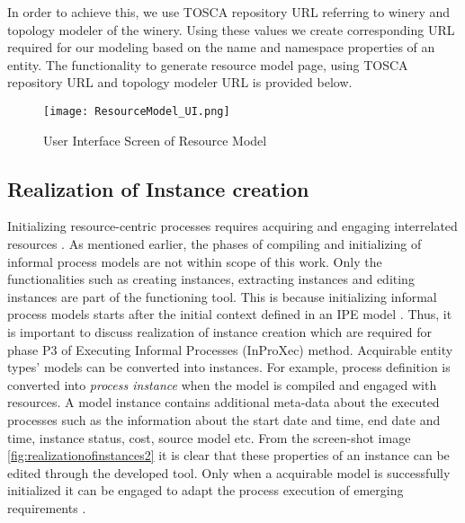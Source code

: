 In order to achieve this, we use TOSCA repository URL referring to winery and topology modeler of the winery. Using these values we create corresponding URL required for our modeling based on the name and namespace properties of an entity. The functionality to generate resource model page, using TOSCA repository URL and topology modeler URL is provided below.

			
			
\begin{figure}
	\centering
	\texttt{[image: ResourceModel\_UI.png]}
	\caption{User Interface Screen of Resource Model}
	\label{fig:realizationofresourcemodel}
\end{figure}
		
\subsection{Realization of Instance creation}
Initializing resource-centric processes requires acquiring and engaging interrelated resources \cite{Sungur2015}. As mentioned earlier, the phases of compiling and initializing of informal process models are not within scope of this work. Only the functionalities such as creating instances, extracting instances and editing instances are part of the functioning tool. This is because initializing informal process models starts after the initial context defined in an IPE model \cite{Sungur2015}. Thus, it is important to discuss realization of instance creation which are required for phase P3 of Executing Informal Processes (InProXec) method. Acquirable entity types' models can be converted into instances. For example, process definition is converted into \textit{process instance} when the model is compiled and engaged with resources. A model instance contains additional meta-data about the executed processes such as the information about the start date and time, end date and time, instance status, cost, source model etc. From the screen-shot image \ref{fig:realizationofinstances2} it is clear that these properties of an instance can be edited through the developed tool. Only when a acquirable model is successfully initialized it can be engaged to adapt the process execution of emerging requirements \cite{Sungur2015}. 

